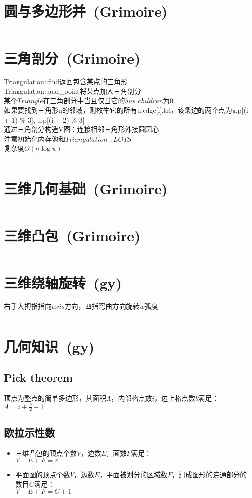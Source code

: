 \section{圆与多边形并\ \small(Grimoire)}
	\inputminted{cpp}{Geometry/area_union.cpp}
\section{三角剖分\ \small(Grimoire)}
	Triangulation::find返回包含某点的三角形
	\\Triangulation::add\_point将某点加入三角剖分
	\\某个$ Triangle $在三角剖分中当且仅当它的$ has\_children $为$ 0 $
	\\如果要找到三角形u的邻域，则枚举它的所有u.edge[i].tri，该条边的两个点为u.p[(i + 1) \% 3], u.p[(i + 2) \% 3]
	\\通过三角剖分构造V图：连接相邻三角形外接圆圆心
	\\注意初始化内存池和$ Triangulation::LOTS $
	\\复杂度$ O(n \log n) $
	\inputminted{cpp}{Geometry/delaunay_triangulation.cpp}
\section{三维几何基础\ \small(Grimoire)}
	\inputminted{cpp}{Geometry/3d_basic.cpp}
\section{三维凸包\ \small(Grimoire)}
	\inputminted{cpp}{Geometry/3d_convex.cpp}
\section{三维绕轴旋转\ \small(gy)}
	右手大拇指指向$ axis $方向，四指弯曲方向旋转$ w $弧度
	\inputminted{cpp}{Geometry/3d_rotate.cpp}
\section{几何知识\ \small(gy)}
	\subsection*{Pick theorem}
		顶点为整点的简单多边形，其面积$ A $，内部格点数$ i $，边上格点数$ b $满足：
		\\$ A = i + \frac{b}{2} - 1 $
	\subsection*{欧拉示性数}
		\begin{itemize}
			\item 三维凸包的顶点个数$ V $，边数$ E $，面数$ F $满足：
			\\$ V - E + F = 2 $
			\item 平面图的顶点个数$ V $，边数$ E $，平面被划分的区域数$ F $，组成图形的连通部分的数目$ C $满足：
			\\$ V - E + F = C + 1 $
		\end{itemize}

